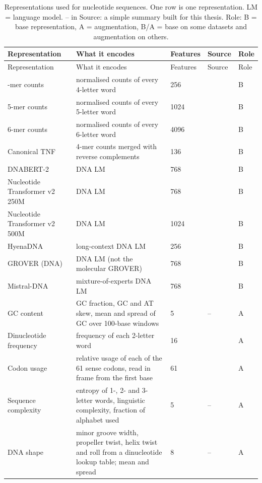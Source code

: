 \begin{longtable}{p{3.2cm}p{5.6cm}p{1.6cm}p{1.6cm}p{1.4cm}}
\caption{Representations used for nucleotide sequences. One row is one representation. LM = language model. -- in Source: a simple summary built for this thesis. Role: B = base representation, A = augmentation, B/A = base on some datasets and augmentation on others.}\label{tab:reps_nucleotides}\\
\toprule
Representation & What it encodes & Features & Source & Role \\
\midrule
\endfirsthead
\toprule
Representation & What it encodes & Features & Source & Role \\
\midrule
\endhead
\bottomrule
\endfoot
4-mer counts & normalised counts of every 4-letter word & 256 & \citep{Vinga2003} & B \\
5-mer counts & normalised counts of every 5-letter word & 1024 & \citep{Vinga2003} & B \\
6-mer counts & normalised counts of every 6-letter word & 4096 & \citep{Vinga2003} & B \\
Canonical TNF & 4-mer counts merged with reverse complements & 136 & \citep{Teeling2004} & B \\
DNABERT-2 & DNA LM & 768 & \citep{Zhou2023DNABERT2} & B \\
Nucleotide Transformer v2 250M & DNA LM & 768 & \citep{DallaTorre2025} & B \\
Nucleotide Transformer v2 500M & DNA LM & 1024 & \citep{DallaTorre2025} & B \\
HyenaDNA & long-context DNA LM & 256 & \citep{Nguyen2023HyenaDNA} & B \\
GROVER (DNA) & DNA LM (not the molecular GROVER) & 768 & \citep{Sanabria2024} & B \\
Mistral-DNA & mixture-of-experts DNA LM & 768 & \citep{Mourad2024} & B \\
GC content & GC fraction, GC and AT skew, mean and spread of GC over 100-base windows & 5 & -- & A \\
Dinucleotide frequency & frequency of each 2-letter word & 16 & \citep{Vinga2003} & A \\
Codon usage & relative usage of each of the 61 sense codons, read in frame from the first base & 61 & \citep{Sharp1986} & A \\
Sequence complexity & entropy of 1-, 2- and 3-letter words, linguistic complexity, fraction of alphabet used & 5 & -- & A \\
DNA shape & minor groove width, propeller twist, helix twist and roll from a dinucleotide lookup table; mean and spread & 8 & -- & A \\
\end{longtable}

